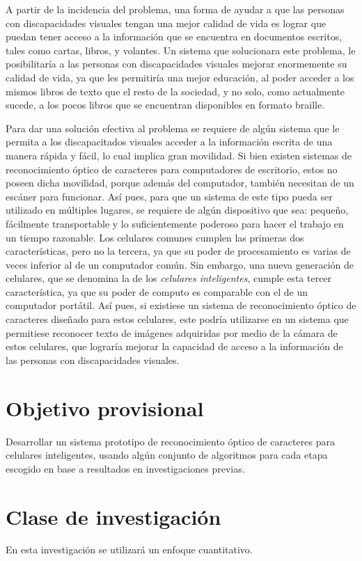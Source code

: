 \documentclass[a4paper, 11pt, oneside]{article}
\begin{document}
	A partir de la incidencia del problema, una forma de ayudar a que las personas con discapacidades visuales tengan una mejor calidad de vida es lograr que puedan tener acceso a la información que se encuentra en documentos escritos, tales como cartas, libros, y volantes. Un sistema que solucionara este problema, le posibilitaría a las personas con discapacidades visuales mejorar enormemente su calidad de vida, ya que les permitiría una mejor educación, al poder acceder a los mismos libros de texto que el resto de la sociedad, y no solo, como actualmente sucede, a los pocos libros que se encuentran disponibles en formato braille.

	Para dar una solución efectiva al problema se requiere de algún sistema que le permita a los discapacitados visuales acceder a la información escrita de una manera rápida y fácil, lo cual implica gran movilidad. Si bien existen sistemas de reconocimiento óptico de caracteres para computadores de escritorio, estos no poseen dicha movilidad, porque además del computador, también necesitan de un escáner para funcionar. Así pues, para que un sistema de este tipo pueda ser utilizado en múltiples lugares, se requiere de algún dispositivo que sea: pequeño, fácilmente transportable y lo suficientemente poderoso para hacer el trabajo en un tiempo razonable. Los celulares comunes cumplen las primeras dos características, pero no la tercera, ya que su poder de procesamiento es varias de veces inferior al de un computador común. Sin embargo, una nueva generación de celulares, que se denomina la de los \textit{celulares inteligentes}, cumple esta tercer característica, ya que su poder de computo es comparable con el de un computador portátil. Así pues, si existiese un sistema de reconocimiento óptico de caracteres diseñado para estos celulares, este podría utilizarse en un sistema que permitiese reconocer texto de imágenes adquiridas por medio de la cámara de estos celulares, que lograría mejorar la capacidad de acceso a la información de las personas con discapacidades visuales.
	\clearpage
	\section{Objetivo provisional}
	Desarrollar un sistema prototipo de reconocimiento óptico de caracteres para celulares inteligentes, usando algún conjunto de algoritmos para cada etapa escogido en base a resultados en investigaciones previas.
	\clearpage
	\section{Clase de investigación}
	En esta investigación se utilizará un enfoque cuantitativo. 
	\clearpage
\end{document}
